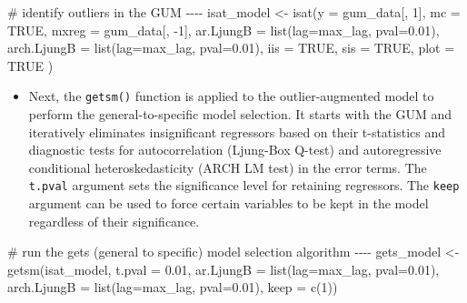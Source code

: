 \documentclass[
  letterpaper,
  DIV=11,
  numbers=noendperiod]{scrreport}
\newenvironment{Shaded}{\begin{snugshade}}{\end{snugshade}}
\newcommand{\AttributeTok}[1]{\textcolor[rgb]{0.40,0.45,0.13}{#1}}
\newcommand{\CommentTok}[1]{\textcolor[rgb]{0.37,0.37,0.37}{#1}}
\newcommand{\ConstantTok}[1]{\textcolor[rgb]{0.56,0.35,0.01}{#1}}
\newcommand{\DecValTok}[1]{\textcolor[rgb]{0.68,0.00,0.00}{#1}}
\newcommand{\FloatTok}[1]{\textcolor[rgb]{0.68,0.00,0.00}{#1}}
\newcommand{\FunctionTok}[1]{\textcolor[rgb]{0.28,0.35,0.67}{#1}}
\newcommand{\NormalTok}[1]{\textcolor[rgb]{0.00,0.23,0.31}{#1}}
\newcommand{\OtherTok}[1]{\textcolor[rgb]{0.00,0.23,0.31}{#1}}
\newcommand{\SpecialCharTok}[1]{\textcolor[rgb]{0.37,0.37,0.37}{#1}}
\providecommand{\tightlist}{%
  \setlength{\itemsep}{0pt}\setlength{\parskip}{0pt}}\usepackage{longtable,booktabs,array}
\begin{document}
\begin{Shaded}
\begin{Highlighting}[]
\CommentTok{\# identify outliers in the GUM {-}{-}{-}{-}}
\NormalTok{isat\_model }\OtherTok{\textless{}{-}} \FunctionTok{isat}\NormalTok{(}\AttributeTok{y =}\NormalTok{ gum\_data[, }\DecValTok{1}\NormalTok{], }
  \AttributeTok{mc =} \ConstantTok{TRUE}\NormalTok{, }
  \AttributeTok{mxreg =}\NormalTok{ gum\_data[, }\SpecialCharTok{{-}}\DecValTok{1}\NormalTok{], }
  \AttributeTok{ar.LjungB =} \FunctionTok{list}\NormalTok{(}\AttributeTok{lag=}\NormalTok{max\_lag, }
  \AttributeTok{pval=}\FloatTok{0.01}\NormalTok{), }
  \AttributeTok{arch.LjungB =} \FunctionTok{list}\NormalTok{(}\AttributeTok{lag=}\NormalTok{max\_lag, }\AttributeTok{pval=}\FloatTok{0.01}\NormalTok{), }
  \AttributeTok{iis =} \ConstantTok{TRUE}\NormalTok{, }
  \AttributeTok{sis =} \ConstantTok{TRUE}\NormalTok{, }
  \AttributeTok{plot =} \ConstantTok{TRUE}
\NormalTok{)}
\end{Highlighting}
\end{Shaded}

\begin{itemize}
\tightlist
\item
  Next, the \texttt{getsm()} function is applied to the
  outlier-augmented model to perform the general-to-specific model
  selection. It starts with the GUM and iteratively eliminates
  insignificant regressors based on their t-statistics and diagnostic
  tests for autocorrelation (Ljung-Box Q-test) and autoregressive
  conditional heteroskedasticity (ARCH LM test) in the error terms. The
  \texttt{t.pval} argument sets the significance level for retaining
  regressors. The \texttt{keep} argument can be used to force certain
  variables to be kept in the model regardless of their significance.
\end{itemize}

\begin{Shaded}
\begin{Highlighting}[]
\CommentTok{\# run the gets (general to specific) model selection algorithm {-}{-}{-}{-}}
\NormalTok{gets\_model }\OtherTok{\textless{}{-}} \FunctionTok{getsm}\NormalTok{(isat\_model, }
  \AttributeTok{t.pval =} \FloatTok{0.01}\NormalTok{, }
  \AttributeTok{ar.LjungB =} \FunctionTok{list}\NormalTok{(}\AttributeTok{lag=}\NormalTok{max\_lag, }\AttributeTok{pval=}\FloatTok{0.01}\NormalTok{), }
  \AttributeTok{arch.LjungB =} \FunctionTok{list}\NormalTok{(}\AttributeTok{lag=}\NormalTok{max\_lag, }
  \AttributeTok{pval=}\FloatTok{0.01}\NormalTok{), }
  \AttributeTok{keep =} \FunctionTok{c}\NormalTok{(}\DecValTok{1}\NormalTok{))}
\end{Highlighting}
\end{Shaded}
\end{document}
